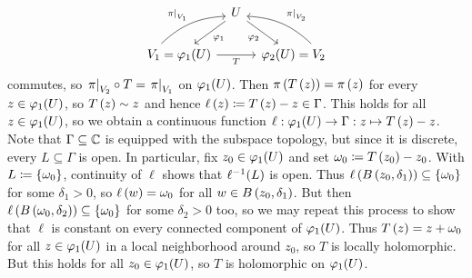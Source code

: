 \documentclass[../Moduli_Spaces_of_Riemann_Surfaces.tex]{subfiles}
\begin{document}
\begin{example}
        \begin{equation*}
            \begin{tikzcd}[column sep=0.1in]
                & U \ar[dl, "\phi_1"] \ar[dr, "\phi_2"'] \\
                V_1=\phi_1(U) \ar[ur, "\l.\pi\r|_{V_1}", bend left=20, start anchor={[xshift=-20px]}] \ar[rr, "T"'] & & \phi_2(U)=V_2 \ar[ul, "\l.\pi\r|_{V_2}"', bend right=20, start anchor={[xshift=20px]}]
            \end{tikzcd}
        \end{equation*}
        commutes, so $\left.\pi\right|_{V_2}\circ T=\left.\pi\right|_{V_1}$ on $\varphi_1\!\left(U\right)$. Then $\pi\left(T\left(z\right)\right)=\pi\left(z\right)$ for every $z\in\varphi_1\!\left(U\right)$, so $T\left(z\right)\sim z$ and hence $\ell\left(z\right)\coloneqq T\left(z\right)-z\in\Gamma$. This holds for all $z\in\varphi_1\!\left(U\right)$, so we obtain a continuous function $\ell:\varphi_1\!\left(U\right)\to\Gamma:z\mapsto T\left(z\right)-z$. Note that $\Gamma\subseteq\mathbb{C}$ is equipped with the subspace topology, but since it is discrete, every $L\subseteq\Gamma$ is open. In particular, fix $z_0\in\varphi_1\!\left(U\right)$ and set $\omega_0\coloneqq T\left(z_0\right)-z_0$. With $L\coloneqq\left\{\omega_0\right\}$, continuity of $\ell$ shows that $\ell^{-1}\!\left(L\right)$ is open. Thus $\ell\left(B\left(z_0,\delta_1\right)\right)\subseteq\left\{\omega_0\right\}$ for some $\delta_1>0$, so $\ell\left(w\right)=\omega_0$ for all $w\in B\left(z_0,\delta_1\right)$. But then $\ell\left(B\left(\omega_0,\delta_2\right)\right)\subseteq\left\{\omega_0\right\}$ for some $\delta_2>0$ too, so we may repeat this process to show that $\ell$ is constant on every connected component of $\varphi_1\!\left(U\right)$. Thus $T\left(z\right)=z+\omega_0$ for all $z\in\varphi_1\!\left(U\right)$ in a local neighborhood around $z_0$, so $T$ is locally holomorphic. But this holds for all $z_0\in\varphi_1\!\left(U\right)$, so $T$ is holomorphic on $\varphi_1\!\left(U\right)$.\exqed
    \end{example}
\end{document}
